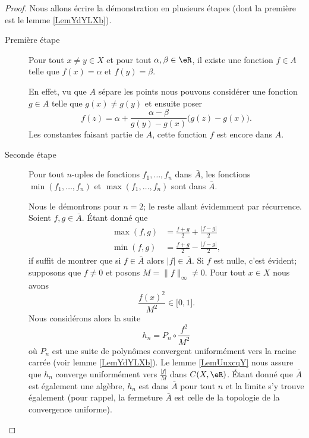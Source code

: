 \begin{proof}
    Nous allons écrire la démonstration en plusieurs étapes (dont la première est le lemme \ref{LemYdYLXb}).

    \begin{description}
        \item[Première étape] Pour tout \( x\neq y\in X\) et pour tout \( \alpha,\beta\in \eR\), il existe une fonction \( f\in A\) telle que \( f(x)=\alpha\) et \( f(y)=\beta\). 

            En effet, vu que \( A\) sépare les points nous pouvons considérer une fonction \( g\in A\) telle que \( g(x)\neq g(y)\) et ensuite poser
            \begin{equation}
                f(z)=\alpha+\frac{ \alpha-\beta }{ g(y)-g(x) }\big( g(z)-g(x) \big).
            \end{equation}
            Les constantes faisant partie de \( A\), cette fonction \( f\) est encore dans \( A\).

        \item[Seconde étape] Pour tout \( n\)-uples de fonctions \( f_1,\ldots, f_n\) dans \( \bar A\), les fonctions \( \min(f_1,\ldots, f_n)\) et \( \max(f_1,\ldots, f_n)\) sont dans \( \bar A\).

            Nous le démontrons pour \( n=2\); le reste allant évidemment par récurrence. Soient \( f,g\in \bar A\). Étant donné que
            \begin{subequations}
                \begin{align}
                    \max(f,g)&=\frac{ f+g }{2}+\frac{ | f-g | }{2}\\
                    \min(f,g)&=\frac{ f+g }{2}-\frac{ | f-g | }{2},
                \end{align}
            \end{subequations}
            if suffit de montrer que si \( f\in\bar A\) alors \( | f |\in \bar A\). Si \( f\) est nulle, c'est évident; supposons que \( f\neq 0\) et posons \( M=\| f \|_{\infty}\neq 0\). Pour tout \( x\in X\) nous avons
            \begin{equation}
                \frac{ f(x)^2 }{ M^2 }\in \mathopen[ 0 , 1 \mathclose].
            \end{equation}
            Nous considérons alors la suite
            \begin{equation}
                h_n=P_n\circ\frac{ f^2 }{ M^2 }
            \end{equation}
            où \( P_n\) est une suite de polynômes convergent uniformément vers la racine carrée (voir lemme \ref{LemYdYLXb}). Le lemme \ref{LemUuxcqY} nous assure que \( h_n\) converge uniformément vers \( \frac{ | f | }{ M }\) dans \( C(X,\eR)\). Étant donné que \( \bar A\) est également une algèbre, \( h_n\) est dans \( \bar A\) pour tout \( n\) et la limite s'y trouve également (pour rappel, la fermeture \( \bar A\) est celle de la topologie de la convergence uniforme).


\end{description}
\end{proof}
